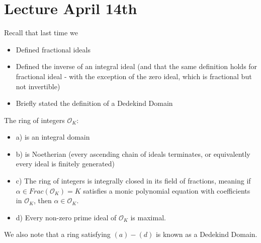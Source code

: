 \section{Lecture April 14th}

Recall that last time we
\begin{itemize}
    \item Defined fractional ideals
    \item Defined the inverse of an integral ideal (and that the same definition holds for fractional ideal - with the exception of the zero ideal, which is fractional but not invertible)
    \item Briefly stated the definition of a Dedekind Domain
\end{itemize}

\begin{theorem}[pg. 109 - S + T]
The ring of integers $\mathcal{O}_K$:
\begin{itemize}
    \item a) is an integral domain
    \item b) is Noetherian (every ascending chain of ideals terminates, or equivalently every ideal is finitely generated)
    \item c) The ring of integers is integrally closed in its field of fractions, meaning if $\alpha \in Frac(\mathcal{O}_K) = K$ satisfies a monic polynomial equation with coefficients in $\mathcal{O}_K$, then $\alpha \in \mathcal{O}_K$.
    \item d) Every non-zero prime ideal of $\mathcal{O}_K$ is maximal.
\end{itemize}
We also note that a ring satisfying $(a) - (d)$ is known as a Dedekind Domain.
\end{theorem}

